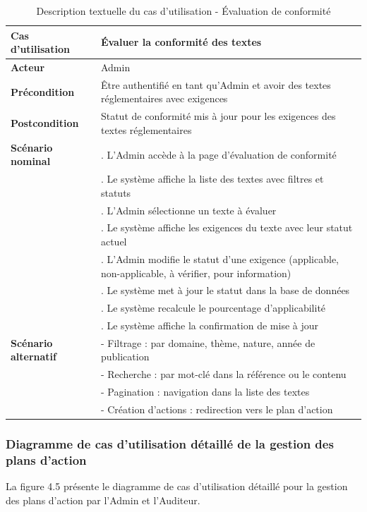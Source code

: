 \begin{longtable}{|>{\raggedright\arraybackslash}p{4cm}|>{\raggedright\arraybackslash}p{9cm}|}
\caption{Description textuelle du cas d'utilisation - Évaluation de conformité}
\label{tab:compliance_evaluation_usecase} \\
\hline
\textbf{Cas d'utilisation} & \textbf{Évaluer la conformité des textes} \\
\hline
\textbf{Acteur} & Admin \\
\hline
\textbf{Précondition} & Être authentifié en tant qu'Admin et avoir des textes réglementaires avec exigences \\
\hline
\textbf{Postcondition} & Statut de conformité mis à jour pour les exigences des textes réglementaires \\
\hline
\textbf{Scénario nominal} & 
1. L'Admin accède à la page d'évaluation de conformité \\
& 2. Le système affiche la liste des textes avec filtres et statuts \\
& 3. L'Admin sélectionne un texte à évaluer \\
& 4. Le système affiche les exigences du texte avec leur statut actuel \\
& 5. L'Admin modifie le statut d'une exigence (applicable, non-applicable, à vérifier, pour information) \\
& 6. Le système met à jour le statut dans la base de données \\
& 7. Le système recalcule le pourcentage d'applicabilité \\
& 8. Le système affiche la confirmation de mise à jour \\
\hline
\textbf{Scénario alternatif} & 
- Filtrage : par domaine, thème, nature, année de publication \\
& - Recherche : par mot-clé dans la référence ou le contenu \\
& - Pagination : navigation dans la liste des textes \\
& - Création d'actions : redirection vers le plan d'action \\
\hline
\end{longtable}

\subsubsection{Diagramme de cas d'utilisation détaillé de la gestion des plans d'action}
\noindent La figure 4.5 présente le diagramme de cas d'utilisation détaillé pour la gestion des plans d'action par l'Admin et l'Auditeur.

